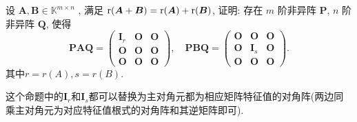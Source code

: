 \documentclass[../../main.tex]{subfiles}%
\begin{document}
\begin{proposition}\label{proposition:矩阵和的秩等于秩的和可同时相抵标准化}
设 $\boldsymbol{A},\boldsymbol{B}\in \mathbb{K}^{m \times n}$ , 满足 ${\rm r}(\boldsymbol{A} + \boldsymbol{B}) = {\rm r}(\boldsymbol{A}) + {\rm r}(\boldsymbol{B})$, 证明: 存在 $m$ 阶非异阵 $\boldsymbol{P}$, $n$ 阶非异阵 $\boldsymbol{Q}$, 使得
$$
\boldsymbol{P}\boldsymbol{A}\boldsymbol{Q} = \begin{pmatrix}
\boldsymbol{I}_r & \boldsymbol{O} & \boldsymbol{O} \\
\boldsymbol{O} & \boldsymbol{O} & \boldsymbol{O} \\
\boldsymbol{O} & \boldsymbol{O} & \boldsymbol{O}
\end{pmatrix}, \quad \boldsymbol{P}\boldsymbol{B}\boldsymbol{Q} = \begin{pmatrix}
\boldsymbol{O} & \boldsymbol{O} & \boldsymbol{O} \\
\boldsymbol{O} & \boldsymbol{I}_s & \boldsymbol{O} \\
\boldsymbol{O} & \boldsymbol{O} & \boldsymbol{O}
\end{pmatrix}.
$$
其中$r=r(A),s=r(B).$
\end{proposition}
\begin{note}
这个命题中的$\boldsymbol{I}_r$和$\boldsymbol{I}_s$都可以替换为主对角元都为相应矩阵特征值的对角阵(两边同乘主对角元为对应特征值根式的对角阵和其逆矩阵即可).
\end{note}
\end{document}
